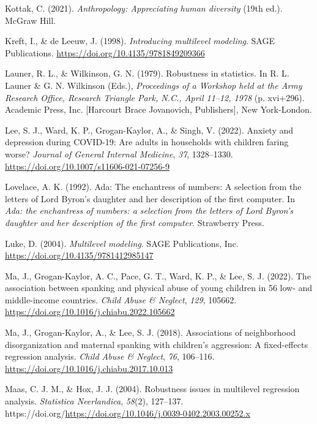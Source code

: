 \documentclass[
  letterpaper,
  DIV=11,
  numbers=noendperiod]{scrreprt}
\newlength{\cslhangindent}
\newenvironment{CSLReferences}[2] %
 {\begin{list}{}{%
  \setlength{\itemindent}{0pt}
  \setlength{\leftmargin}{0pt}
  \setlength{\parsep}{0pt}
  \ifodd #1
   \setlength{\leftmargin}{\cslhangindent}
   \setlength{\itemindent}{-1\cslhangindent}
  \fi
  \setlength{\itemsep}{#2\baselineskip}}}
 {\end{list}}
\begin{document}
\begin{CSLReferences}{1}{0}
Kottak, C. (2021). \emph{Anthropology: Appreciating human diversity}
(19th ed.). McGraw Hill.

Kreft, I., \& de Leeuw, J. (1998). \emph{Introducing multilevel
modeling}. SAGE Publications.
\url{https://doi.org/10.4135/9781849209366}

Launer, R. L., \& Wilkinson, G. N. (1979). Robustness in statistics. In
R. L. Launer \& G. N. Wilkinson (Eds.), \emph{Proceedings of a
{W}orkshop held at the {A}rmy {R}esearch {O}ffice, {R}esearch {T}riangle
{P}ark, {N}.{C}., {A}pril 11--12, 1978} (p. xvi+296). Academic Press,
Inc. {[}Harcourt Brace Jovanovich, Publishers{]}, New York-London.

Lee, S. J., Ward, K. P., Grogan-Kaylor, A., \& Singh, V. (2022). Anxiety
and depression during {COVID-19}: Are adults in households with children
faring worse? \emph{Journal of General Internal Medicine}, \emph{37},
1328--1330. \url{https://doi.org/10.1007/s11606-021-07256-9}

Lovelace, A. K. (1992). Ada: The enchantress of numbers: A selection
from the letters of {L}ord {B}yron's daughter and her description of the
first computer. In \emph{Ada: the enchantress of numbers: a selection
from the letters of {L}ord {B}yron's daughter and her description of the
first computer}. Strawberry Press.

Luke, D. (2004). \emph{Multilevel modeling}. SAGE Publications, Inc.
\url{https://doi.org/10.4135/9781412985147}

Ma, J., Grogan-Kaylor, A. C., Pace, G. T., Ward, K. P., \& Lee, S. J.
(2022). {The association between spanking and physical abuse of young
children in 56 low- and middle-income countries}. \emph{Child Abuse \&
Neglect}, \emph{129}, 105662.
\url{https://doi.org/10.1016/j.chiabu.2022.105662}

Ma, J., Grogan-Kaylor, A., \& Lee, S. J. (2018). Associations of
neighborhood disorganization and maternal spanking with children's
aggression: A fixed-effects regression analysis. \emph{Child Abuse \&
Neglect}, \emph{76}, 106--116.
\url{https://doi.org/10.1016/j.chiabu.2017.10.013}

Maas, C. J. M., \& Hox, J. J. (2004). Robustness issues in multilevel
regression analysis. \emph{Statistica Neerlandica}, \emph{58}(2),
127--137.
https://doi.org/\url{https://doi.org/10.1046/j.0039-0402.2003.00252.x}


\end{CSLReferences}
\end{document}
